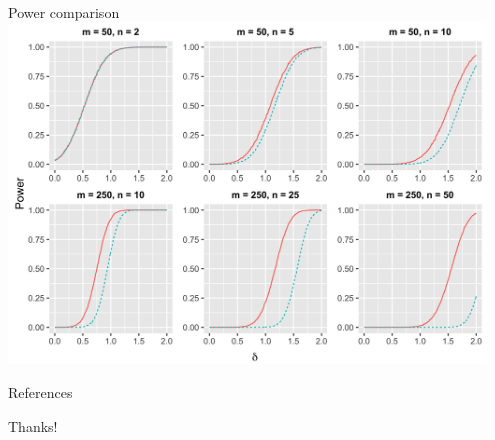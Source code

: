 \documentclass{beamer}
\begin{document}
\begin{frame}{Power comparison}
\centering
\includegraphics[width=0.95\textwidth]{multinomial-power.png}
\end{frame}

\begin{frame}[allowframebreaks]{References}
\footnotesize{


}
\end{frame}

\begin{frame}
\centering
{\Large Thanks!}
\end{frame}
\end{document}
